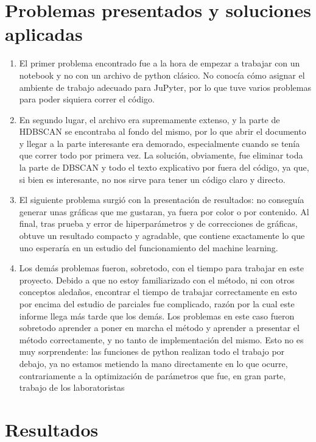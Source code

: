 \documentclass[10pt,twocolumn]{article}
\begin{document}
\section{Problemas presentados y soluciones aplicadas}

\begin{enumerate}
  \item  El primer problema encontrado fue a la hora de empezar a trabajar con un notebook y no con un archivo 
  de python clásico. No conocía cómo asignar el ambiente de trabajo adecuado para JuPyter, por lo que tuve 
  varios problemas para poder siquiera correr el código. 
  \item En segundo lugar, el archivo era supremamente extenso, y la parte de HDBSCAN se encontraba al fondo del mismo, 
  por lo que abrir el documento y llegar a la parte interesante era demorado, especialmente cuando se tenía que correr
  todo por primera vez. La solución, obviamente, fue eliminar toda la parte de DBSCAN y todo el texto explicativo por 
  fuera del código, ya que, si bien es interesante, no nos sirve para tener un código claro y directo. 
  \item El siguiente problema surgió con la presentación de resultados: no conseguía generar unas gráficas 
  que me gustaran, ya fuera por color o por contenido. Al final, tras prueba y error de hiperparámetros y de 
  correcciones de gráficas, obtuve un resultado compacto y agradable, que contiene exactamente lo que uno esperaría
  en un estudio del funcionamiento del machine learning.
  \item Los demás problemas fueron, sobretodo, con el tiempo para trabajar en este proyecto. Debido a que no estoy
  familiarizado con el método, ni con otros conceptos aledaños, encontrar el tiempo de trabajar correctamente en esto
  por encima del estudio de parciales fue complicado, razón por la cual este informe llega más tarde que los demás.
  Los problemas en este caso fueron sobretodo aprender a poner en marcha el método y aprender a presentar el método
  correctamente, y no tanto de implementación del mismo. Esto no es muy sorprendente: las funciones de python 
  realizan todo el trabajo por debajo, ya no estamos metiendo la mano directamente en lo que ocurre, contrariamente
  a la optimización de parámetros que fue, en gran parte, trabajo de los laboratoristas
\end{enumerate}

\section{Resultados}
\end{document}
